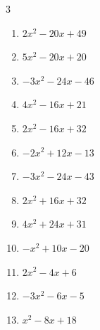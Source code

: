 \begin{multicols}{3}
\begin{enumerate}

  \item $2x^{2}-20x+49$


  \item $5x^{2}-20x+20$


  \item $-3x^{2}-24x-46$


\columnbreak %

\resetques

  \item $4x^{2}-16x+21$


  \item $2x^{2}-16x+32$


  \item $-2x^{2}+12x-13$


  \item $-3x^{2}-24x-43$


  \item $2x^{2}+16x+32$


  \item $4x^{2}+24x+31$


  \item $-x^{2}+10x-20$


  \item $2x^{2}-4x+6$


  \item $-3x^{2}-6x-5$


  \item $x^{2}-8x+18$


\end{enumerate}
\end{multicols}
